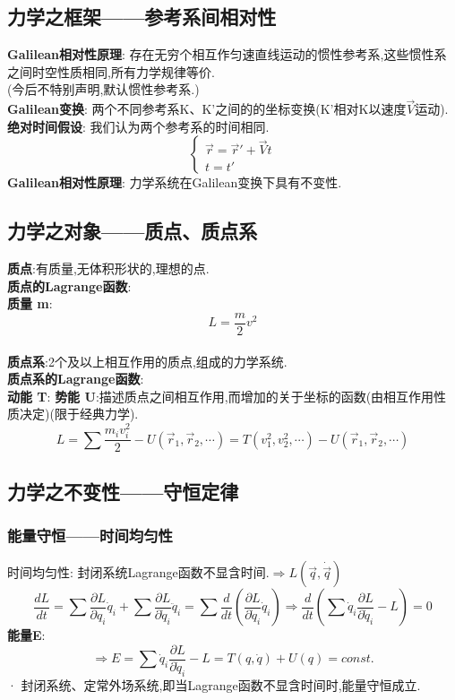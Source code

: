 \documentclass{article}
\begin{document}
\subsection{力学之框架——参考系间相对性}
\textbf{Galilean相对性原理}: 存在无穷个相互作匀速直线运动的惯性参考系,这些惯性系之间时空性质相同,所有力学规律等价.\\
(今后不特别声明,默认惯性参考系.)\\
\textbf{Galilean变换}: 两个不同参考系K、K'之间的的坐标变换(K'相对K以速度$\vec V$运动).\\
\textbf{绝对时间假设}: 我们认为两个参考系的时间相同.
\begin{displaymath}
    \left\{ \begin{array}{ll}
    \vec r = \vec r' + \vec V t\\
    t = t'
    \end{array} \right.
\end{displaymath}
\textbf{Galilean相对性原理}: 力学系统在Galilean变换下具有不变性.


\subsection{力学之对象——质点、质点系}
\textbf{质点}:有质量,无体积形状的,理想的点.\\
\textbf{质点的Lagrange函数}:\\
\textbf{质量 m}:
$$L = \frac{m}{2} v^2$$
\\
\textbf{质点系}:2个及以上相互作用的质点,组成的力学系统.\\
\textbf{质点系的Lagrange函数}:\\
\textbf{动能 T}: \quad \textbf{势能 U}:描述质点之间相互作用,而增加的关于坐标的函数(由相互作用性质决定)(限于经典力学).
$$L = \sum \frac{m_i v_i^2}{2} - U(\vec r_1,\vec r_2,\cdots ) = T(v_1^2,v_2^2,\cdots) - U(\vec r_1,\vec r_2,\cdots )$$


\subsection{力学之不变性——守恒定律}
\subsubsection{能量守恒——时间均匀性}
时间均匀性: 封闭系统Lagrange函数不显含时间.\quad $\Rightarrow L(\vec q,\dot \vec q)$\\
$$\frac{dL}{dt} = \sum \frac{\partial L}{\partial q_i} \dot q_i + \sum \frac{\partial L}{\partial \dot q_i} \ddot q_i = \sum \frac{d}{dt}(\frac{\partial L}{\partial \dot q_i}\dot q_i)
\Rightarrow \frac{d}{dt}(\sum \dot q_i \frac{\partial L}{\partial \dot q_i} - L) = 0$$
\textbf{能量E}: 
$$\Rightarrow E = \sum \dot q_i \frac{\partial L}{\partial \dot q_i} - L  = T(q,\dot q) + U(q) = const.$$
· 封闭系统、定常外场系统,即当Lagrange函数不显含时间时,能量守恒成立.
\end{document}
